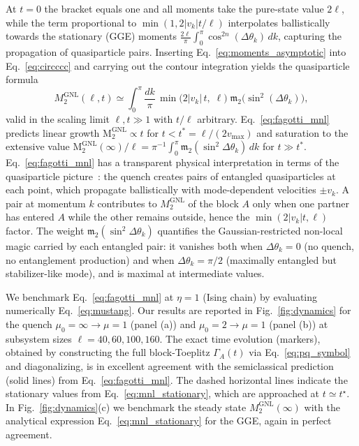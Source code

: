 \documentclass[prx,twocolumn,superscriptaddress,aps,10pt, frontmatterverbose, reprint,footinbib,longbibliography=true]{revtex4-2}
\newcommand{\NL}{\mathrm{GNL}}
\newcommand{\MNL}{\mathrm{M}_2^{\NL}}
\providecommand{\DIFaddtex}[1]{{\protect\color{red}\uwave{#1}}} %
\providecommand{\DIFdeltex}[1]{{\protect\color{red}\sout{#1}}}                      %
\providecommand{\DIFaddbegin}{\protect\color{red}} %
\providecommand{\DIFaddend}{\protect\color{black}} %
\providecommand{\DIFdelbegin}{} %
\providecommand{\DIFdelend}{} %
\providecommand{\DIFadd}[1]{\texorpdfstring{\DIFaddtex{#1}}{#1}} %
\providecommand{\DIFdel}[1]{\texorpdfstring{\DIFdeltex{#1}}{}} %
\newcommand{\DIFscaledelfig}{0.5}
\newlength{\DIFdelgraphicswidth} %
\newlength{\DIFdelgraphicsheight} %
\newcommand{\DIFaddincludegraphics}[2][]{{\color{blue}\fbox{\DIFOincludegraphics[#1]{#2}}}} %
\newcommand{\DIFdelincludegraphics}[2][]{%
\sbox{\DIFdelgraphicsbox}{\DIFOincludegraphics[#1]{#2}}%
\settoboxwidth{\DIFdelgraphicswidth}{\DIFdelgraphicsbox} %
\settoboxtotalheight{\DIFdelgraphicsheight}{\DIFdelgraphicsbox} %
\scalebox{\DIFscaledelfig}{%
\parbox[b]{\DIFdelgraphicswidth}{\usebox{\DIFdelgraphicsbox}\\[-\baselineskip] \rule{\DIFdelgraphicswidth}{0em}}\llap{\resizebox{\DIFdelgraphicswidth}{\DIFdelgraphicsheight}{%
\setlength{\unitlength}{\DIFdelgraphicswidth}%
\begin{picture}(1,1)%
\thicklines\linethickness{2pt} %
{\color[rgb]{1,0,0}\put(0,0){\framebox(1,1){}}}%
{\color[rgb]{1,0,0}\put(0,0){\line( 1,1){1}}}%
{\color[rgb]{1,0,0}\put(0,1){\line(1,-1){1}}}%
\end{picture}%
}\hspace*{3pt}}} %
} %
\DeclareRobustCommand{\DIFaddbegin}{\DIFOaddbegin \let\includegraphics\DIFaddincludegraphics} %
\DeclareRobustCommand{\DIFaddend}{\DIFOaddend \let\includegraphics\DIFOincludegraphics} %
\DeclareRobustCommand{\DIFdelbegin}{\DIFOdelbegin \let\includegraphics\DIFdelincludegraphics} %
\DeclareRobustCommand{\DIFdelend}{\DIFOaddend \let\includegraphics\DIFOincludegraphics} %
\begin{document}
At $t=0$ the bracket equals one and all moments take the pure-state value $2\ell$, while the term proportional to $\min(1,2|v_k|t/\ell)$ interpolates ballistically towards  the stationary (GGE) moments $\frac{2\ell}{\pi}\int_0^\pi\cos^{2n}(\Delta\theta_k)\,dk$, capturing the propagation of quasiparticle pairs.
Inserting Eq.~\eqref{eq:moments_asymptotic} into  Eq.~\eqref{eq:circccc} and carrying out the contour integration yields the quasiparticle formula
\begin{equation}
    M_2^{\mathrm{GNL}}(\ell,t) \simeq \int_0^\pi\!\frac{dk}{\pi}\,\min\!\bigl(2|v_k|\,t,\;\ell\bigr)\;\mathfrak{m}_2\!\bigl(\sin^2(\Delta\theta_k)\bigr),
    \label{eq:fagotti_mnl}
\end{equation}
valid in the scaling limit $\ell, t \gg 1$ with $t/\ell$ arbitrary.
Eq.~\eqref{eq:fagotti_mnl} predicts linear growth $\MNL \propto t$ for $t < t^* = \ell/(2v_{\max})$ and saturation to the extensive value $\MNL(\infty)/\ell = \pi^{-1}\int_0^\pi \mathfrak{m}_2(\sin^2\!\Delta\theta_k)\, dk$ for $t \gg t^*$.
Eq.~\eqref{eq:fagotti_mnl} has a transparent physical interpretation in terms of the quasiparticle picture~\cite{Calabrese2005evolution,Fagotti2008}: the quench creates pairs of entangled quasiparticles at each point, which propagate ballistically with mode-dependent velocities $\pm v_k$.
A pair at momentum $k$ contributes to $M_2^{\mathrm{GNL}}$ of the block $A$ only when one partner has entered $A$ while the other remains outside, hence the $\min(2|v_k|t,\ell)$ factor.
The weight $\mathfrak{m}_2(\sin^2\Delta\theta_k)$  quantifies the Gaussian-restricted non-local magic carried by each entangled pair: it vanishes both when $\Delta\theta_k = 0$ (no quench, no entanglement production) and when $\Delta\theta_k = \pi/2$ (maximally entangled but stabilizer-like mode), and is maximal at intermediate values.

We benchmark Eq.~\eqref{eq:fagotti_mnl} at $\eta=1$ (Ising chain) by  evaluating numerically Eq.~\eqref{eq:mustang}. 
Our results are reported in Fig.~\ref{fig:dynamics} for the quench $\mu_0 = \infty \to \mu = 1$ (panel (a))  and $\mu_0 = 2 \to \mu = 1$ (panel (b)) at subsystem sizes \DIFdelbegin \DIFdel{$\ell = 40, 60, 100, 160$}\DIFdelend \DIFaddbegin \DIFadd{$\ell = 20, 40, 60, 100, 160$}\DIFaddend . 
The exact time evolution (markers), obtained by constructing the full block-Toeplitz $\Gamma_A(t)$ via Eq.~\eqref{eq:pq_symbol} and diagonalizing, is in excellent agreement with the semiclassical prediction (solid lines) from Eq.~\eqref{eq:fagotti_mnl}.
The dashed horizontal lines indicate the stationary values from Eq.~\eqref{eq:mnl_stationary}, which are approached at $t \simeq t^\star$.
In Fig.~\ref{fig:dynamics}(c) we benchmark the steady state $M_2^{\mathrm{GNL}}(\infty)$ with the analytical expression Eq.~\eqref{eq:mnl_stationary} for the GGE, again in perfect agreement. 
\end{document}
